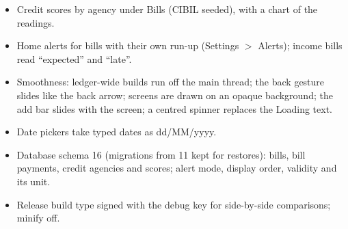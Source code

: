 \documentclass{article}
\begin{document}
\begin{itemize}
        \item Credit scores by agency under Bills (CIBIL seeded), with a chart of the readings.
        \item Home alerts for bills with their own run-up (Settings $>$ Alerts); income bills read ``expected'' and ``late''.
        \item Smoothness: ledger-wide builds run off the main thread; the back gesture slides like the back arrow; screens are drawn on an opaque background; the add bar slides with the screen; a centred spinner replaces the Loading text.
        \item Date pickers take typed dates as dd/MM/yyyy.
        \item Database schema 16 (migrations from 11 kept for restores): bills, bill payments, credit agencies and scores; alert mode, display order, validity and its unit.
        \item Release build type signed with the debug key for side-by-side comparisons; minify off.
    \end{itemize}
\end{document}
